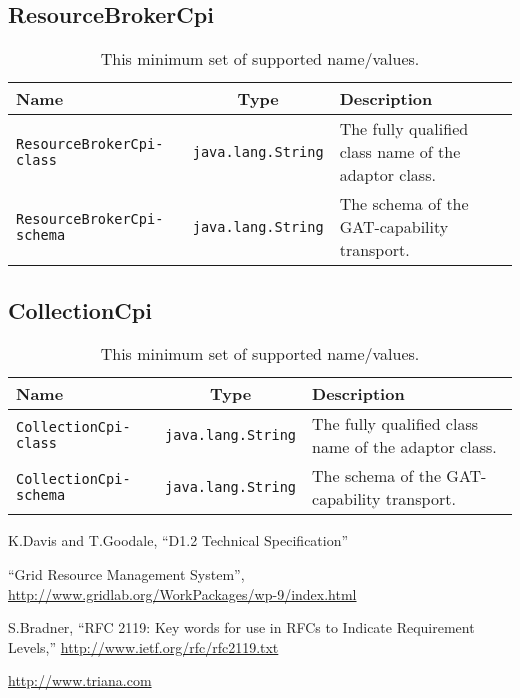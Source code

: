 \documentclass[$Date: 2003/06/26 19:29:31 $]{glabarticle}
\newcommand{\selfreference}[1]{\href{#1}{#1}}
\begin{document}
\newpage

\subsection{ResourceBrokerCpi}

\begin{table}[htp]
\begin{center}
\begin{tabular}{|l|c|l|} \hline
Name & Type & Description \\ \hline\hline
\verb"ResourceBrokerCpi-class" & \verb"java.lang.String" & The fully qualified class name of the adaptor class. \\ \hline
\verb"ResourceBrokerCpi-schema" & \verb"java.lang.String" & The schema of the GAT-capability transport. \\ \hline
\end{tabular}
\end{center}
\caption{This minimum set of supported name/values.}
\label{table:SRD}
\end{table}

\newpage

\subsection{CollectionCpi}

\begin{table}[htp]
\begin{center}
\begin{tabular}{|l|c|l|} \hline
Name & Type & Description \\ \hline\hline
\verb"CollectionCpi-class" & \verb"java.lang.String" & The fully qualified class name of the adaptor class. \\ \hline
\verb"CollectionCpi-schema" & \verb"java.lang.String" & The schema of the GAT-capability transport. \\ \hline
\end{tabular}
\end{center}
\caption{This minimum set of supported name/values.}
\label{table:SRD}
\end{table}

\newpage

\begin{appendix}

\begin{thebibliography}{00}

 K.Davis and T.Goodale,  ``D1.2 Technical Specification''

 ``Grid Resource Management System'',  \selfreference{http://www.gridlab.org/WorkPackages/wp-9/index.html}

 S.Bradner,  ``RFC 2119: Key words for use in RFCs to Indicate Requirement Levels,'' 
\selfreference{http://www.ietf.org/rfc/rfc2119.txt}

 \selfreference{http://www.triana.com}

\end{thebibliography}

\end{appendix}
\end{document}
